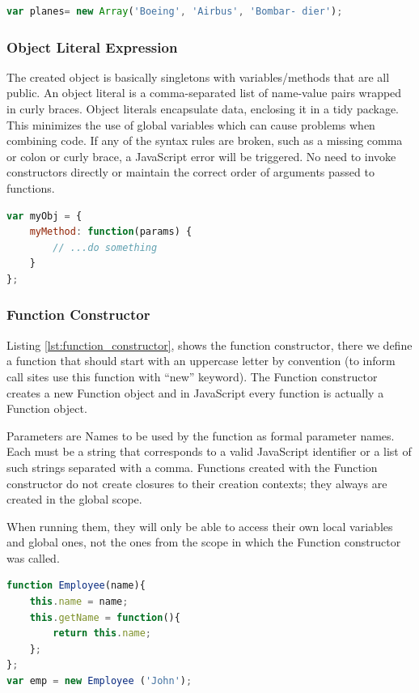 \medskip
\begin{lstlisting}[caption={Array constructor},label={lst:array_constructor},language=JavaScript]
var planes= new Array('Boeing', 'Airbus', 'Bombar- dier');
\end{lstlisting}

\noindent\subsubsection{Object Literal Expression}


The created object is basically singletons with variables/methods that are all public. An object literal is a comma-separated list of name-value pairs wrapped in curly braces. Object literals encapsulate data, enclosing it in a tidy package. This minimizes the use of global variables which can cause problems when combining code. If any of the syntax rules are broken, such as a missing comma or colon or curly brace, a JavaScript error will be triggered. No need to invoke constructors directly or maintain the correct order of arguments passed to functions.
\begin{lstlisting}[caption={Object literal expression},label={lst:object_literal_expression},language=JavaScript] 
var myObj = {
	myMethod: function(params) {
		// ...do something
	}
};
\end{lstlisting}

\noindent\subsubsection{Function Constructor}

Listing \ref{lst:function_constructor}, shows the function constructor, there we define a function that should start with an uppercase letter by convention (to inform call sites use this function with “new” keyword). The Function constructor creates a new Function object and in JavaScript every function is actually a Function object.

Parameters are Names to be used by the function as formal parameter names. Each must be a string that corresponds to a valid JavaScript identifier or a list of such strings separated with a comma. Functions created with the Function constructor do not create closures to their creation contexts; they always are created in the global scope.

When running them, they will only be able to access their own local variables and global ones, not the ones from the scope in which the Function constructor was called.

\begin{lstlisting}[caption={Function constructor},label={lst:function_constructor},language=JavaScript] 
function Employee(name){
	this.name = name;
	this.getName = function(){
		return this.name;
	};	
};
var emp = new Employee ('John');
\end{lstlisting}